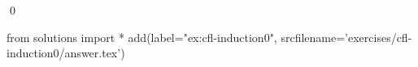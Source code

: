 
\begin{ex} 
  \label{ex:cfl-induction0}
  
  \qed
\end{ex} 
\begin{python0}
from solutions import *
add(label="ex:cfl-induction0",
    srcfilename='exercises/cfl-induction0/answer.tex') 
\end{python0}

